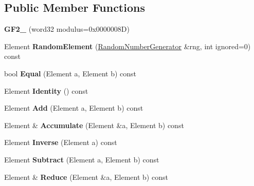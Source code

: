 \subsection*{Public Member Functions}
\begin{DoxyCompactItemize}
\item 
\hypertarget{class_g_f2__32_a0e8888bb5c2653a1e420e2049ea58116}{
{\bfseries GF2\_} (word32 modulus=0x0000008D)}
\label{class_g_f2__32_a0e8888bb5c2653a1e420e2049ea58116}

\item 
\hypertarget{class_g_f2__32_a84f0d206384fd60c469edf08d38e444b}{
Element {\bfseries RandomElement} (\hyperlink{class_random_number_generator}{RandomNumberGenerator} \&rng, int ignored=0) const }
\label{class_g_f2__32_a84f0d206384fd60c469edf08d38e444b}

\item 
\hypertarget{class_g_f2__32_ad16015273674388aca9e0d849ab1c8ec}{
bool {\bfseries Equal} (Element a, Element b) const }
\label{class_g_f2__32_ad16015273674388aca9e0d849ab1c8ec}

\item 
\hypertarget{class_g_f2__32_a5ad6fa38ae519827acbc6ba256696be5}{
Element {\bfseries Identity} () const }
\label{class_g_f2__32_a5ad6fa38ae519827acbc6ba256696be5}

\item 
\hypertarget{class_g_f2__32_a26c77a3e7123d5bc2cd4d3a1f641ed5c}{
Element {\bfseries Add} (Element a, Element b) const }
\label{class_g_f2__32_a26c77a3e7123d5bc2cd4d3a1f641ed5c}

\item 
\hypertarget{class_g_f2__32_a7db1cc0120c984a734470cc7aa5651f4}{
Element \& {\bfseries Accumulate} (Element \&a, Element b) const }
\label{class_g_f2__32_a7db1cc0120c984a734470cc7aa5651f4}

\item 
\hypertarget{class_g_f2__32_ab36550ca16b0d7f9022c9ea07cab05be}{
Element {\bfseries Inverse} (Element a) const }
\label{class_g_f2__32_ab36550ca16b0d7f9022c9ea07cab05be}

\item 
\hypertarget{class_g_f2__32_a1201d78bdaf3d65915d0304b06aea7af}{
Element {\bfseries Subtract} (Element a, Element b) const }
\label{class_g_f2__32_a1201d78bdaf3d65915d0304b06aea7af}

\item 
\hypertarget{class_g_f2__32_aaa4b1c8c86a24c02d9fa02c823afdfda}{
Element \& {\bfseries Reduce} (Element \&a, Element b) const }
\label{class_g_f2__32_aaa4b1c8c86a24c02d9fa02c823afdfda}


\end{DoxyCompactItemize}
